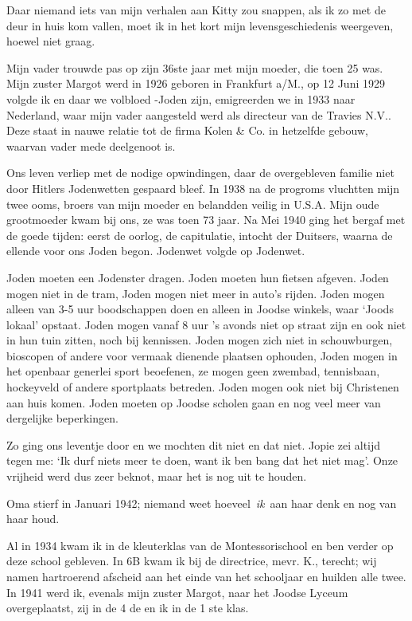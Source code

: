 \documentclass{book}
\begin{document}
Daar niemand iets van mijn verhalen aan Kitty zou snappen, als ik zo met de deur
in huis kom vallen, moet ik in het kort mijn levensgeschiedenis weergeven,
hoewel niet graag.

Mijn vader trouwde pas op zijn 36ste jaar met mijn moeder, die toen 25 was. Mijn
zuster Margot werd in 1926 geboren in Frankfurt a/M., op 12 Juni 1929 volgde ik
en daar we volbloed -Joden zijn, emigreerden we in 1933 naar Nederland, waar
mijn vader aangesteld werd als directeur van de Travies N.V.. Deze staat in
nauwe relatie tot de firma Kolen \& Co. in hetzelfde gebouw, waarvan vader mede
deelgenoot is.

Ons leven verliep met de nodige opwindingen, daar de overgebleven familie niet
door Hitlers Jodenwetten gespaard bleef. In 1938 na de progroms vluchtten mijn
twee ooms, broers van mijn moeder en belandden veilig in U.S.A. Mijn oude
grootmoeder kwam bij ons, ze was toen 73 jaar. Na Mei 1940 ging het bergaf met
de goede tijden: eerst de oorlog, de capitulatie, intocht der Duitsers, waarna
de ellende voor ons Joden begon. Jodenwet volgde op Jodenwet.

Joden moeten een Jodenster dragen. Joden moeten hun fietsen afgeven. Joden mogen
niet in de tram, Joden mogen niet meer in auto's rijden. Joden mogen alleen van
3-5 uur boodschappen doen en alleen in Joodse winkels, waar `Joods lokaal'
opstaat. Joden mogen vanaf 8 uur 's avonds niet op straat zijn en ook niet in
hun tuin zitten, noch bij kennissen. Joden mogen zich niet in schouwburgen,
bioscopen of andere voor vermaak dienende plaatsen ophouden, Joden mogen in het
openbaar generlei sport beoefenen, ze mogen geen zwembad, tennisbaan, hockeyveld
of andere sportplaats betreden. Joden mogen ook niet bij Christenen aan huis
komen. Joden moeten op Joodse scholen gaan en nog veel meer van dergelijke
beperkingen.

Zo ging ons leventje door en we mochten dit niet en dat niet. Jopie zei altijd
tegen me: `Ik durf niets meer te doen, want ik ben bang dat het niet mag'. Onze
vrijheid werd dus zeer beknot, maar het is nog uit te houden.

Oma stierf in Januari 1942; niemand weet hoeveel~\emph{ik}~aan haar denk en nog
van haar houd.

Al in 1934 kwam ik in de kleuterklas van de Montessorischool en ben verder op
deze school gebleven. In 6B kwam ik bij de directrice, mevr.  K., terecht; wij
namen hartroerend afscheid aan het einde van het schooljaar en huilden alle
twee. In 1941 werd ik, evenals mijn zuster Margot, naar het Joodse Lyceum
overgeplaatst, zij in de 4 de en ik in de 1 ste klas.
\end{document}
